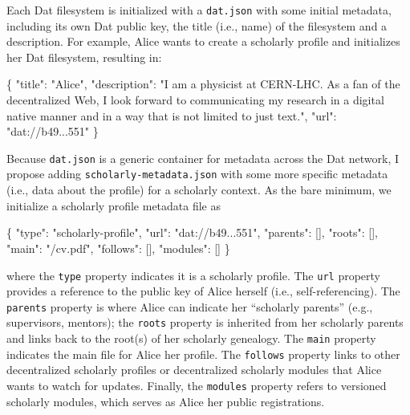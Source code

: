 \documentclass[a4paper]{article}
\newenvironment{Shaded}{\begin{snugshade}}{\end{snugshade}}
\newcommand{\DataTypeTok}[1]{\textcolor[rgb]{0.13,0.29,0.53}{#1}}
\newcommand{\FunctionTok}[1]{\textcolor[rgb]{0.00,0.00,0.00}{#1}}
\newcommand{\OtherTok}[1]{\textcolor[rgb]{0.56,0.35,0.01}{#1}}
\newcommand{\StringTok}[1]{\textcolor[rgb]{0.31,0.60,0.02}{#1}}
\begin{document}
Each Dat filesystem is initialized with a \texttt{dat.json} with some
initial metadata, including its own Dat public key, the title (i.e.,
name) of the filesystem and a description. For example, Alice wants to
create a scholarly profile and initializes her Dat filesystem, resulting
in:

\begin{Shaded}
\begin{Highlighting}[]
\FunctionTok{\{}
  \DataTypeTok{"title"}\FunctionTok{:} \StringTok{"Alice"}\FunctionTok{,}
  \DataTypeTok{"description"}\FunctionTok{:} \StringTok{"I am a physicist at CERN-LHC. As a fan of the decentralized Web, I look forward to communicating my research in a digital native manner and in a way that is not limited to just text."}\FunctionTok{,}
  \DataTypeTok{"url"}\FunctionTok{:} \StringTok{"dat://b49...551"}
\FunctionTok{\}}
\end{Highlighting}
\end{Shaded}

Because \texttt{dat.json} is a generic container for metadata across the
Dat network, I propose adding \texttt{scholarly-metadata.json} with some
more specific metadata (i.e., data about the profile) for a scholarly
context. As the bare minimum, we initialize a scholarly profile metadata
file as

\begin{Shaded}
\begin{Highlighting}[]
\FunctionTok{\{}
  \DataTypeTok{"type"}\FunctionTok{:} \StringTok{"scholarly-profile"}\FunctionTok{,}
  \DataTypeTok{"url"}\FunctionTok{:} \StringTok{"dat://b49...551"}\FunctionTok{,}
  \DataTypeTok{"parents"}\FunctionTok{:} \OtherTok{[]}\FunctionTok{,}
  \DataTypeTok{"roots"}\FunctionTok{:} \OtherTok{[]}\FunctionTok{,}
  \DataTypeTok{"main"}\FunctionTok{:} \StringTok{"/cv.pdf"}\FunctionTok{,}
  \DataTypeTok{"follows"}\FunctionTok{:} \OtherTok{[]}\FunctionTok{,}
  \DataTypeTok{"modules"}\FunctionTok{:} \OtherTok{[]}
\FunctionTok{\}}
\end{Highlighting}
\end{Shaded}

where the \texttt{type} property indicates it is a scholarly profile.
The \texttt{url} property provides a reference to the public key of
Alice herself (i.e., self-referencing). The \texttt{parents} property is
where Alice can indicate her ``scholarly parents'' (e.g., supervisors,
mentors); the \texttt{roots} property is inherited from her scholarly
parents and links back to the root(s) of her scholarly genealogy. The
\texttt{main} property indicates the main file for Alice her profile.
The \texttt{follows} property links to other decentralized scholarly
profiles or decentralized scholarly modules that Alice wants to watch
for updates. Finally, the \texttt{modules} property refers to versioned
scholarly modules, which serves as Alice her public registrations.
\end{document}
